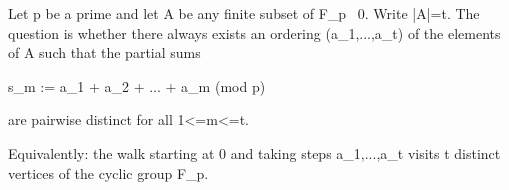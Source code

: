 Let p be a prime and let A be any finite subset of F_p \ {0}. Write |A|=t. The question is whether there always exists an ordering (a_1,...,a_t) of the elements of A such that the partial sums

    s_m := a_1 + a_2 + ... + a_m   (mod p)

are pairwise distinct for all 1<=m<=t.

Equivalently: the walk starting at 0 and taking steps a_1,...,a_t visits t distinct vertices of the cyclic group F_p.
